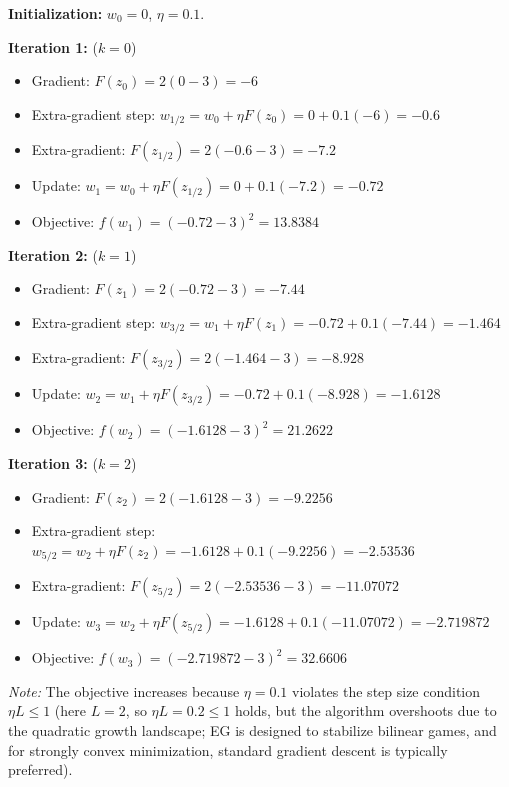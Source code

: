 \documentclass{article}
\begin{document}
\textbf{Initialization:} $w_0 = 0$, $\eta = 0.1$.

\textbf{Iteration 1:} ($k=0$)
\begin{itemize}
\item Gradient: $F(z_0) = 2(0 - 3) = -6$
\item Extra-gradient step: $w_{1/2} = w_0 + \eta F(z_0) = 0 + 0.1(-6) = -0.6$
\item Extra-gradient: $F(z_{1/2}) = 2(-0.6 - 3) = -7.2$
\item Update: $w_1 = w_0 + \eta F(z_{1/2}) = 0 + 0.1(-7.2) = -0.72$
\item Objective: $f(w_1) = (-0.72 - 3)^2 = 13.8384$
\end{itemize}

\textbf{Iteration 2:} ($k=1$)
\begin{itemize}
\item Gradient: $F(z_1) = 2(-0.72 - 3) = -7.44$
\item Extra-gradient step: $w_{3/2} = w_1 + \eta F(z_1) = -0.72 + 0.1(-7.44) = -1.464$
\item Extra-gradient: $F(z_{3/2}) = 2(-1.464 - 3) = -8.928$
\item Update: $w_2 = w_1 + \eta F(z_{3/2}) = -0.72 + 0.1(-8.928) = -1.6128$
\item Objective: $f(w_2) = (-1.6128 - 3)^2 = 21.2622$
\end{itemize}

\textbf{Iteration 3:} ($k=2$)
\begin{itemize}
\item Gradient: $F(z_2) = 2(-1.6128 - 3) = -9.2256$
\item Extra-gradient step: $w_{5/2} = w_2 + \eta F(z_2) = -1.6128 + 0.1(-9.2256) = -2.53536$
\item Extra-gradient: $F(z_{5/2}) = 2(-2.53536 - 3) = -11.07072$
\item Update: $w_3 = w_2 + \eta F(z_{5/2}) = -1.6128 + 0.1(-11.07072) = -2.719872$
\item Objective: $f(w_3) = (-2.719872 - 3)^2 = 32.6606$
\end{itemize}

\textit{Note:} The objective increases because $\eta=0.1$ violates the step size condition $\eta L \leq 1$ (here $L=2$, so $\eta L = 0.2 \leq 1$ holds, but the algorithm overshoots due to the quadratic growth landscape; EG is designed to stabilize bilinear games, and for strongly convex minimization, standard gradient descent is typically preferred).
\end{document}
